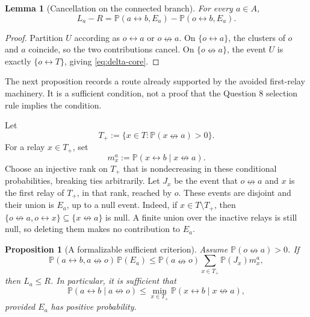\documentclass[11pt]{article}
\newtheorem{proposition}[theorem]{Proposition}
\newtheorem{lemma}[theorem]{Lemma}
\theoremstyle{definition}
\newcommand{\PP}{\mathbb P}
\newcommand{\con}{\leftrightarrow}
\newcommand{\ncon}{\nleftrightarrow}
\newcommand{\1}{\mathbf 1}
\begin{document}
\begin{lemma}[Cancellation on the connected branch]\label{lem:cancel}
For every \(a\in A\),
\begin{equation}\label{eq:delta-core}
 L_a-R
 =\PP(a\con b,E_a)-\PP(o\con b,E_a).
\end{equation}
\end{lemma}

\begin{proof}
Partition \(U\) according as \(o\con a\) or \(o\ncon a\).  On
\(\{o\con a\}\), the clusters of \(o\) and \(a\) coincide, so the two
contributions cancel.  On \(\{o\ncon a\}\), the event \(U\) is exactly
\(\{o\con T\}\), giving \eqref{eq:delta-core}.
\end{proof}

The next proposition records a route already supported by the avoided
first-relay machinery.  It is a sufficient condition, not a proof that the
Question 8 selection rule implies the condition.

Let
\begin{equation}\label{eq:Tplus}
 T_+:=\{x\in T:\PP(x\ncon a)>0\}.
\end{equation}
For a relay \(x\in T_+\), set
\begin{equation}\label{eq:mx}
 m_x^{a}:=\PP(x\con b\mid x\ncon a).
\end{equation}
Choose an injective rank on \(T_+\) that is nondecreasing in these
conditional probabilities, breaking ties arbitrarily.  Let \(J_x\) be the
event that \(o\ncon a\) and \(x\) is the first relay of \(T_+\), in that
rank, reached by \(o\).  These events are disjoint and their union is
\(E_a\), up to a null event.  Indeed, if
\(x\in T\setminus T_+\), then
\(\{o\ncon a,o\con x\}\subseteq\{x\ncon a\}\) is null.  A finite union
over the inactive relays is still null, so deleting them makes no
contribution to \(E_a\).

\begin{proposition}[A formalizable sufficient criterion]
\label{prop:sufficient}
Assume \(\PP(o\ncon a)>0\).  If
\begin{equation}\label{eq:sufficient}
 \PP(a\con b,a\ncon o)\,\PP(E_a)
 \le \PP(a\ncon o)\sum_{x\in T_+}\PP(J_x)m_x^a,
\end{equation}
then \(L_a\le R\).  In particular, it is sufficient that
\begin{equation}\label{eq:strong-sufficient}
 \PP(a\con b\mid a\ncon o)
 \le \min_{x\in T_+}
       \PP(x\con b\mid x\ncon a),
\end{equation}
provided \(E_a\) has positive probability.
\end{proposition}
\end{document}
